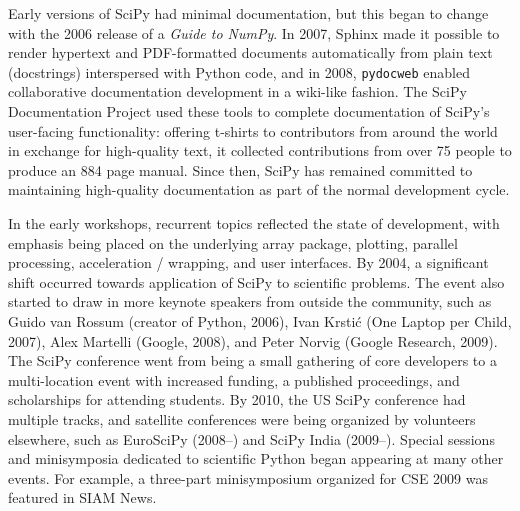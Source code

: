 \documentclass[fleqn,10pt]{wlscirep}
\begin{document}
Early versions of SciPy had minimal documentation, but this began to change
with the 2006 release of a \emph{Guide to NumPy}\cite{oliphant2006guide}. 
In 2007, Sphinx\cite{sphinx} made it possible to render hypertext and 
PDF-formatted documents automatically from plain text (docstrings) 
interspersed with Python code, and in 2008, \texttt{pydocweb}\cite{pydocweb}
enabled collaborative documentation development in a wiki-like fashion.
The SciPy Documentation Project \cite{van2008scipy, harrington2008scipy} 
used these tools to complete documentation of SciPy's user-facing
functionality: offering t-shirts to contributors from around the world in 
exchange for high-quality text, it collected contributions from over 75 people 
to produce an 884 page manual\cite{harrington2009scipy}. Since then,
SciPy has remained committed to maintaining high-quality documentation as 
part of the normal development cycle.


In the early workshops, recurrent topics reflected the state of development, with
emphasis being placed on the underlying array package, plotting,
parallel processing, acceleration / wrapping, and user interfaces.  By
2004, a significant shift occurred towards application of SciPy to
scientific problems.  The event also started to draw in more keynote
speakers from outside the community, such as Guido van Rossum (creator
of Python, 2006), Ivan Krstić (One Laptop per Child, 2007), Alex
Martelli (Google, 2008), and Peter Norvig (Google Research, 2009).
The SciPy conference went from being a small gathering of
core developers to a multi-location event with increased funding, a
published proceedings, and scholarships for attending students.
By 2010, the US SciPy conference had multiple tracks, and satellite
conferences were being organized by volunteers elsewhere, such as EuroSciPy
(2008–) and SciPy India (2009–).
Special sessions and minisymposia dedicated to scientific Python began
appearing at many other events.
For example, a three-part minisymposium organized for CSE 2009 was
featured in SIAM News\cite{siamcse09}.
\end{document}
